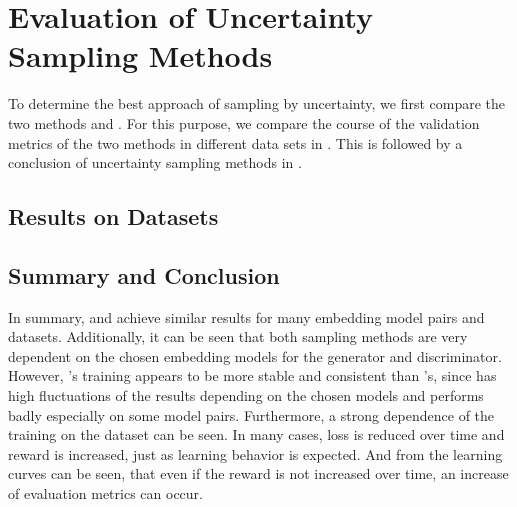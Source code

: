 \section{Evaluation of Uncertainty Sampling Methods}
\label{ch:evaluation:sec:evaluation_methods}
%
To determine the best approach of sampling by uncertainty, we first compare the two methods \usmax and \ussoftmax.
For this purpose, we compare the course of the validation metrics of the two methods in different data sets in .
This is followed by a conclusion of uncertainty sampling methods in  .
%
\subsection{Results on Datasets} \label{subsec:methods_results}














%
\subsection{Summary and Conclusion} 
\label{subsec:methods_conclusion}
In summary, \usmax and \ussoftmax achieve similar results for many embedding model pairs and datasets.
Additionally, it can be seen that both sampling methods are very dependent on the chosen embedding models for the generator and discriminator.
However, \ussoftmax's training appears to be more stable and consistent than \usmax's, since \usmax has high fluctuations of the results depending on the chosen models and performs badly especially on some model pairs.
Furthermore, a strong dependence of the training on the dataset can be seen.
In many cases, loss is reduced over time and reward is increased, just as learning behavior is expected.
And from the learning curves can be seen, that even if the reward is not increased over time, an increase of evaluation metrics can occur.

